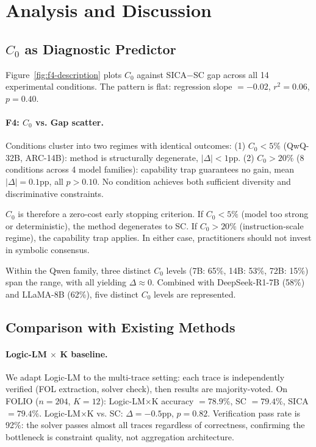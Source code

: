 \documentclass[11pt,a4paper]{article}
\begin{document}
\section{Analysis and Discussion}

\subsection{$C_0$ as Diagnostic Predictor}
\label{sec:c0-diagnostic}

Figure~\ref{fig:f4-description} plots $C_0$ against SICA$-$SC gap across all 14 experimental conditions. The pattern is flat: regression slope $= -0.02$, $r^2 = 0.06$, $p = 0.40$.

\paragraph{F4: $C_0$ vs. Gap scatter.} Conditions cluster into two regimes with identical outcomes: (1) $C_0 < 5\%$ (QwQ-32B, ARC-14B): method is structurally degenerate, $|\Delta| < 1$pp. (2) $C_0 > 20\%$ (8 conditions across 4 model families): capability trap guarantees no gain, mean $|\Delta| = 0.1$pp, all $p > 0.10$. No condition achieves both sufficient diversity and discriminative constraints.

$C_0$ is therefore a zero-cost early stopping criterion. If $C_0 < 5\%$ (model too strong or deterministic), the method degenerates to SC. If $C_0 > 20\%$ (instruction-scale regime), the capability trap applies. In either case, practitioners should not invest in symbolic consensus.

Within the Qwen family, three distinct $C_0$ levels (7B: 65\%, 14B: 53\%, 72B: 15\%) span the range, with all yielding $\Delta \approx 0$. Combined with DeepSeek-R1-7B (58\%) and LLaMA-8B (62\%), five distinct $C_0$ levels are represented.

\subsection{Comparison with Existing Methods}

\paragraph{Logic-LM $\times$ K baseline.} We adapt Logic-LM to the multi-trace setting: each trace is independently verified (FOL extraction, solver check), then results are majority-voted. On FOLIO ($n{=}204$, $K{=}12$): Logic-LM$\times$K accuracy $= 78.9\%$, SC $= 79.4\%$, SICA $= 79.4\%$. Logic-LM$\times$K vs. SC: $\Delta = -0.5$pp, $p = 0.82$. Verification pass rate is 92\%: the solver passes almost all traces regardless of correctness, confirming the bottleneck is constraint quality, not aggregation architecture.
\end{document}
